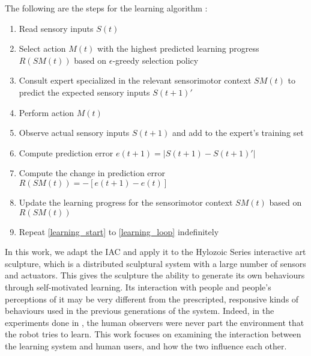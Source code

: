 The following are the steps for the learning algorithm \cite{Oudeyer2007}:

\begin{enumerate}
	\item \label{learning_start} Read sensory inputs $S(t)$
	\item Select action $M(t)$ with the highest predicted learning progress $R(SM(t))$ based on $\epsilon$-greedy selection policy
	\item Consult expert specialized in the relevant sensorimotor context $SM(t)$ to predict the expected sensory inputs $S(t+1)'$
	\item Perform action $M(t)$
	\item Observe actual sensory inputs $S(t+1)$ and add to the expert's training set
	\item Compute prediction error $e(t+1) = |S(t+1) - S(t+1)'|$
	\item Compute the change in prediction error $R(SM(t)) = -[e(t+1) - e(t)]$
	\item Update the learning progress for the sensorimotor context $SM(t)$ based on $R(SM(t))$
	\item \label{learning_loop} Repeat \ref{learning_start} to \ref{learning_loop} indefinitely
\end{enumerate}

In this work, we adapt the IAC and apply it to the Hylozoic Series interactive art sculpture, which is a distributed sculptural system with a large number of sensors and actuators. This gives the sculpture the ability to generate its own behaviours through self-motivated learning. Its interaction with people and people's perceptions of it may be very different from the prescripted, responsive kinds of behaviours used in the previous generations of the system. Indeed, in the experiments done in \cite{Oudeyer2007}, the human observers were never part the environment that the robot tries to learn. This work focuses on examining the interaction between the learning system and human users, and how the two influence each other.

